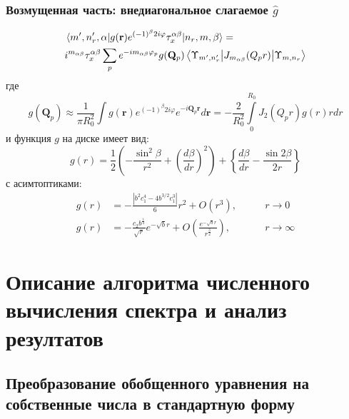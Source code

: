 \documentclass[a4paper,article,14pt]{extarticle}
\begin{document}
\subsubsection{Возмущенная часть: внедиагональное слагаемое $\hat g$}

\begin{equation}
\label{eq:final_g}
\begin{aligned}
&\mel{m', n'_r, \alpha} {g(\mathbf{r})   e^{ (-1)^{\beta} 2  i   \varphi} \tau^{\alpha \beta}_x} {n_r,m,\beta} = \\ 
&i^{m_{\alpha \beta}} \tau^{\alpha \beta}_x \sum\limits_{p}      e^{-i m_{\alpha \beta} \varphi_p}  g(\mathbf{Q}_p)\mel{\Upsilon_{m', n'_r}} {J_{m_{\alpha \beta}} ( Q_p r) }{\Upsilon_{m, n_r}}
\end{aligned}
\end{equation}
\noindent где 
\begin{equation}
g (\mathbf{Q}_p) \approx \frac{1}{\pi R_0^2}  \int  g(\mathbf{r})   e^{ (-1)^{\beta} 2  i   \varphi} e^{-i \mathbf{Q}_p \mathbf{r}}  d\mathbf{r} = - \frac{2}{R_0^2}  \int\limits_{0}^{R_0}  J_2 (Q_p r ) g(r) r dr 
\end{equation} 
и функция $g$ на диске имеет вид:
\begin{equation}
g(r) = \frac{1}{2}\left(  - \frac{\sin ^2\beta }{r^2} + \left( \frac{d\beta }{dr} \right)^2 \right) 
+ \left\{ \frac{d\beta }{dr} - \frac{\sin 2\beta }{2r} \right\}
\end{equation}
с асимтоптиками:
\begin{equation}
\begin{aligned}
g(r) &= -\frac{\left|b^2 c_1^4-4 b^{3/2}
   c_1^3\right|}{6} r^2  +O\left(r^3\right), \qquad &r \rightarrow 0 \\
g(r) &= -\frac{c_2 b^\frac{1}{4}}{\sqrt{r}} e^{-\sqrt{b} r} + O\left(\frac{e^{-\sqrt{b} r}}{r^\frac{3}{2}}\right), \qquad &r \rightarrow \infty
\end{aligned}
\end{equation}



\pagebreak
\section{ Описание алгоритма численного вычисления спектра и анализ резултатов  }


\subsection{ Преобразование обобщенного уравнения на собственные числа в стандартную форму  }
\end{document}
